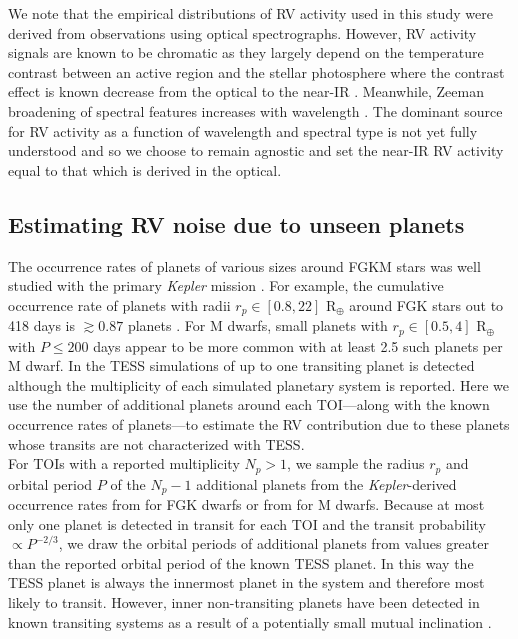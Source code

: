 We note that the
empirical distributions of RV activity used in this study were derived from observations using optical
spectrographs. However, RV activity signals are known to be chromatic as they largely
depend on the temperature contrast between an active region and the stellar photosphere where the contrast
effect is known decrease from the optical to the near-IR
\citep[e.g.][]{martin06,huelamo08,prato08,reiners10,mahmud11}. Meanwhile, Zeeman broadening of spectral
features increases with wavelength \citep{reiners13}. The dominant source for RV activity as a function of wavelength
and spectral type is not yet fully understood \citep{moutou17} and so we choose to remain agnostic and set
the near-IR RV activity equal to that which is derived in the optical.


\subsection{Estimating RV noise due to unseen planets} \label{RVFCsect:planets}
The occurrence rates of planets of various sizes around FGKM stars was well studied with the primary
\emph{Kepler} mission \citep[e.g.][]{fressin13, dressing15a}. For example, the cumulative occurrence rate of planets with
radii $r_p \in [0.8,22]$ R$_{\oplus}$ around FGK stars out to 418 days is $\gtrsim 0.87$ planets \citep{fressin13}.
For M dwarfs, small planets with $r_p \in [0.5,4]$ R$_{\oplus}$ with $P \leq 200$ days appear to be more common with
at least 2.5 such planets per
M dwarf. In the TESS simulations of  up to one transiting planet is detected although the
multiplicity of each simulated planetary system is reported.
Here we use the number of additional planets around each TOI---along with the known occurrence rates of
planets---to estimate the RV contribution due to these planets whose transits
are not characterized with TESS. \\

For TOIs with a reported multiplicity $N_p>1$, we sample the radius $r_p$ and orbital period $P$ of the $N_p-1$
additional planets from the \emph{Kepler}-derived occurrence rates from \cite{fressin13} for FGK dwarfs or from
\cite{dressing15a} for M dwarfs. Because at most only one planet is detected in transit for each TOI and the
transit probability $\propto P^{-2/3}$, we draw the orbital periods of additional planets from values greater than
the reported orbital period of the known TESS planet.
In this way the TESS planet is always the innermost planet in the system and therefore most likely to transit.
However, inner non-transiting planets have been detected in known transiting systems
as a result of a potentially small mutual inclination \citep[$\Delta i \sim 1^{\circ}$;][]{cloutier17b}. \\

